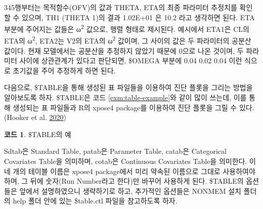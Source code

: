 \documentclass[
  11pt,
  krantz2, a4paper, twoside]{krantz}
\newenvironment{Shaded}{\begin{snugshade}}{\end{snugshade}}
\newcommand{\DataTypeTok}[1]{\textcolor[rgb]{0.13,0.29,0.53}{#1}}
\newcommand{\DecValTok}[1]{\textcolor[rgb]{0.00,0.00,0.81}{#1}}
\newcommand{\NormalTok}[1]{#1}
\theoremstyle{definition}
\theoremstyle{definition}
\newtheorem{example}{코드}[chapter]
\theoremstyle{definition}
\theoremstyle{remark}
\begin{document}
345행부터는 목적함수(OFV)의 값과 THETA, ETA의 최종 파라미터 추정치를 확인할 수 있으며, TH1 (THETA 1)의 결과 1.02E+01 은 10.2 라고 생각하면 된다. ETA 부분에 주어지는 값들은 ω\textsuperscript{2} 값으로, 행렬 형태로 제시된다. 예시에서 ETA1은 CL의 ETA의 ω\textsuperscript{2}, ETA2는 V2의 ETA의 ω\textsuperscript{2} 값이며, 그 사이의 값은 두 파라미터의 공분산 값이다. 현재 모델에서는 공분산을 추정하지 않았기 때문에 0으로 나온 것이며, 두 파라미터 사이에 상관관계가 있다고 판단되면, \$OMEGA 부분에 0.04 0.02 0.04 이런 식으로 초기값을 주어 추정하게 하면 된다.

다음으로, \$TABLE을 통해 생성된 표 파일들을 이용하여 진단 플롯을 그리는 방법을 알아보도록 하자. \$TABLE은 코드 \ref{exm:table-example}와 같이 많이 쓰는데, 이를 통해 생성되는 표 파일들과 R의 xpose4 package를 이용하여 진단 플롯을 그릴 수 있다. (Hooker et al. \protect\hyperlink{ref-R-xpose4}{2020})


\begin{example}
\protect\hypertarget{exm:table-example}{}{\label{exm:table-example} }\$TABLE의 예
\end{example}
\vspace{-5ex}
\small

\begin{Shaded}
\end{Shaded}

\normalsize

Sdtab은 Standard Table, patab은 Parameter Table, catab은 Categorical Covariates Table을 의미하며, cotab은 Continuous Covariates Table을 의미한다. 이 네 개의 테이블 이름은 xpose4 package에서 미리 약속된 이름으로 그대로 사용하여야 하며, 그 뒤에 숫자(Run Number라고 한다)만 바꾸어 사용하게 된다. \$TABLE의 옵션들은 앞에서 설명하였으니 생략하기로 하고, 추가적인 옵션들은 NONMEM 설치 폴더의 help 폴더 안에 있는 \$table.ctl 파일을 참고하도록 하자.
\end{document}
